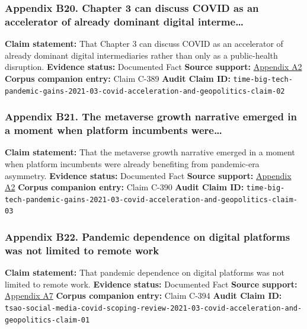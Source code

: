 \documentclass[
  american,
  11pt,
  letterpaper,
]{article}
\begin{document}
\subsubsection{Appendix B20. Chapter 3 can discuss COVID as an
accelerator of already dominant digital
interme\ldots{}}\label{appendix-b20-chapter-3-can-discuss-covid-as-an-accelerator-of-already-dominant-digital-interme}

\textbf{Claim statement:} That Chapter 3 can discuss COVID as an
accelerator of already dominant digital intermediaries rather than only
as a public-health disruption. \textbf{Evidence status:} Documented Fact
\textbf{Source support:}
\hyperref[appendix-a2-big-tech-announces-striking-pandemic-gains-as-small-businesses-strain-to-find-their-footing]{Appendix
A2} \textbf{Corpus companion entry:} Claim C-389 \textbf{Audit Claim
ID:}
\texttt{time-big-tech-pandemic-gains-2021-03-covid-acceleration-and-geopolitics-claim-02}

\subsubsection{Appendix B21. The metaverse growth narrative emerged in a
moment when platform incumbents
were\ldots{}}\label{appendix-b21-the-metaverse-growth-narrative-emerged-in-a-moment-when-platform-incumbents-were}

\textbf{Claim statement:} That the metaverse growth narrative emerged in
a moment when platform incumbents were already benefiting from
pandemic-era asymmetry. \textbf{Evidence status:} Documented Fact
\textbf{Source support:}
\hyperref[appendix-a2-big-tech-announces-striking-pandemic-gains-as-small-businesses-strain-to-find-their-footing]{Appendix
A2} \textbf{Corpus companion entry:} Claim C-390 \textbf{Audit Claim
ID:}
\texttt{time-big-tech-pandemic-gains-2021-03-covid-acceleration-and-geopolitics-claim-03}

\subsubsection{Appendix B22. Pandemic dependence on digital platforms
was not limited to remote
work}\label{appendix-b22-pandemic-dependence-on-digital-platforms-was-not-limited-to-remote-work}

\textbf{Claim statement:} That pandemic dependence on digital platforms
was not limited to remote work. \textbf{Evidence status:} Documented
Fact \textbf{Source support:}
\hyperref[appendix-a7-what-social-media-told-about-us-in-the-time-of-covid-19-a-scoping-review]{Appendix
A7} \textbf{Corpus companion entry:} Claim C-394 \textbf{Audit Claim
ID:}
\texttt{tsao-social-media-covid-scoping-review-2021-03-covid-acceleration-and-geopolitics-claim-01}
\end{document}
